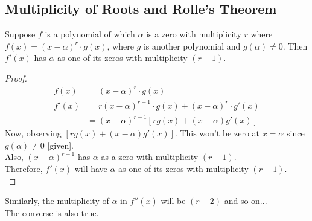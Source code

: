 \documentclass[14]{article}
\theoremstyle{definition}
\begin{document}
\subsection{Multiplicity of Roots and Rolle's Theorem}
Suppose $f$ is a polynomial of which $\alpha$ is a zero with multiplicity $r$ where $f(x) = (x-\alpha)^r \cdot g(x)$, where $g$ is another polynomial and $g(\alpha) \neq 0$. Then $f'(x)$ has $\alpha$ as one of its zeros with multiplicity $(r - 1)$.
\begin{proof}
\begin{align*}
f(x) &= (x - \alpha)^r \cdot g(x)\\
f'(x) &= r(x - \alpha)^{r-1}\cdot g(x) + (x - \alpha)^r \cdot g'(x)\\
&= (x - \alpha)^{r-1} \left[ r g(x) + (x - \alpha) g'(x) \right]
\end{align*}
Now, observing $\left[ r g(x) + (x - \alpha) g'(x) \right]$. This won't be zero at $x = \alpha$ since $g(\alpha) \neq 0$ [given].\\
Also, $(x - \alpha)^{r-1}$ has $\alpha$ as a zero with multiplicity $(r - 1)$.\\
Therefore, $f'(x)$ will have $\alpha$ as one of its zeros with multiplicity $(r - 1)$.\\
\end{proof}
Similarly, the multiplicity of $\alpha$ in $f''(x)$ will be $(r - 2)$ and so on...\\
The converse is also true.
\pagebreak
\end{document}

